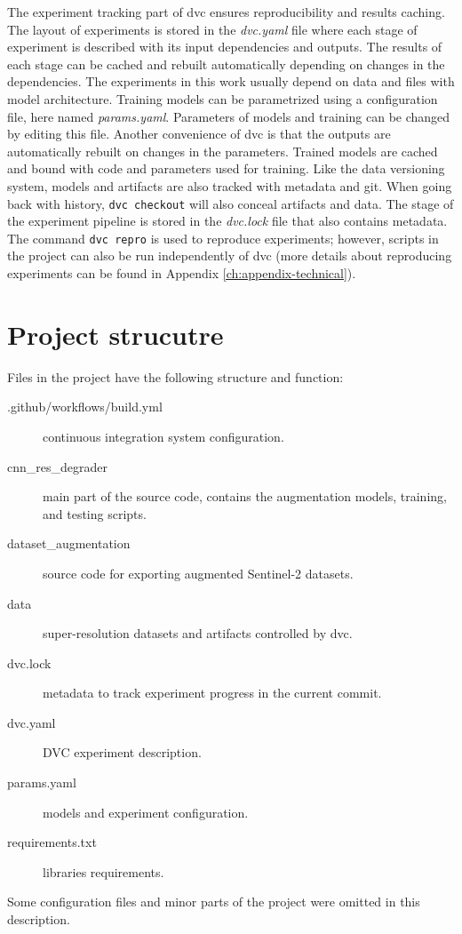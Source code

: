 The experiment tracking part of \gls{dvc} ensures reproducibility and results caching.
The layout of experiments is stored in the \textit{dvc.yaml} file where each stage of experiment is described with its input dependencies and outputs.
The results of each stage can be cached and rebuilt automatically depending on changes in the dependencies.
The experiments in this work usually depend on data and files with model architecture.
Training models can be parametrized using a configuration file, here named \textit{params.yaml}.
Parameters of models and training can be changed by editing this file.
Another convenience of \gls{dvc} is that the outputs are automatically rebuilt on changes in the parameters.
Trained models are cached and bound with code and parameters used for training.
Like the data versioning system, models and artifacts are also tracked with metadata and git.
When going back with history, \texttt{dvc checkout} will also conceal artifacts and data.
The stage of the experiment pipeline is stored in the \textit{dvc.lock} file that also contains metadata.
The command \texttt{dvc repro} is used to reproduce experiments; however, scripts in the project can also be run independently of \gls{dvc} (more details about reproducing experiments can be found in Appendix \ref{ch:appendix-technical}).

\section{Project strucutre}
Files in the project have the following structure and function:
\begin{description}
	\item[.github/workflows/build.yml] continuous integration system configuration.
	\item[cnn\_res\_degrader] main part of the source code, contains the augmentation models, training, and testing scripts.
	\item[dataset\_augmentation] source code for exporting augmented Sentinel-2 datasets.
	\item[data] super-resolution datasets and artifacts controlled by \gls{dvc}.
	\item[dvc.lock] metadata to track experiment progress in the current commit.
	\item[dvc.yaml] DVC experiment description.
	\item[params.yaml] models and experiment configuration.
	\item[requirements.txt] libraries requirements.
\end{description}
Some configuration files and minor parts of the project were omitted in this description.
